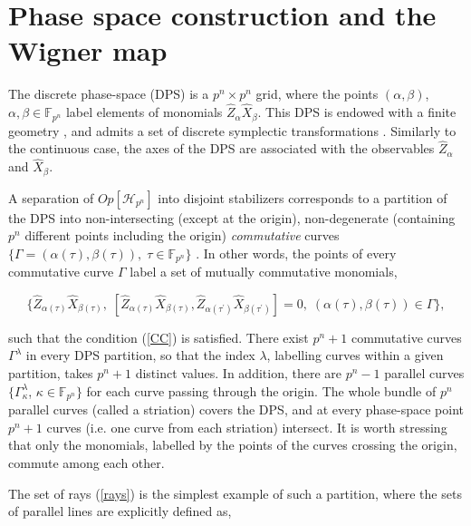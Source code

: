 \documentclass[quantumrep,article,submit,pdftex,moreauthors]{Definitions/mdpi}
\begin{document}

\section{Phase space construction and the Wigner map}

The discrete phase-space (DPS) \cite{gibbons,galvao,cormick,DFW11,DFW12} is a
$p^{n} \times p^{n}$ grid, where the points $(\alpha ,\beta )$, $\alpha,\beta
\in \mathbb{F}_{p^{n}}$ label elements of monomials
$\hat{Z}_{\alpha}\hat{X}_{\beta}$. This DPS is endowed with a finite geometry
\cite{gibbons,galvao,cormick,DFW11,DFW12,FF}, and admits a set of discrete
symplectic transformations \cite{DFW2-1,DFW2-2,DFW2-3,DFW2-4,klimov06}.
Similarly to the continuous case, the axes of the DPS are associated with the
observables $\hat{Z}_{\alpha}$ and $\hat{X}_{\beta}$.

A separation of $Op[\mathcal{H}_{p^{n}}]$ into disjoint stabilizers corresponds
to a partition of the DPS into non-intersecting (except at the origin),
non-degenerate (containing $p^{n}$ different points including the origin)
\textit{commutative} curves $\{\Gamma =\left( \alpha(\tau),\beta(\tau)\right),
\; \tau \in \mathbb{F}_{p^{n}}\}$ \cite{GS2,JPA09}. In other words, the points
of every commutative curve $\Gamma$ label a set of mutually commutative
monomials,

\begin{equation}
  \{\hat{Z}_{\alpha(\tau)}\hat{X}_{\beta(\tau)}, \;
  [\hat{Z}_{\alpha(\tau)} \hat{X}_{\beta(\tau)},
  \hat{Z}_{\alpha (\tau^{\prime})}\hat{X}_{\beta(\tau^{\prime})}]
  = 0, \; \left( \alpha(\tau),\beta(\tau)\right) \in \Gamma \},
\end{equation}

such that the condition (\ref{CC}) is satisfied. There exist $p^{n}+1$
commutative curves $\Gamma^{\lambda}$ in every DPS partition, so that the index
$\lambda$, labelling curves within a given partition, takes $p^{n}+1$ distinct
values. In addition, there are $p^{n}-1$ parallel curves
$\{\Gamma_{\kappa}^{\lambda}$, $\kappa \in \mathbb{F}_{p^{n}}\}$ for each curve
passing through the origin.  The whole bundle of $p^{n}$ parallel curves (called
a striation) covers the DPS, and at every phase-space point $p^{n}+1$ curves
(i.e.  one curve from each striation) intersect. It is worth stressing that only
the monomials, labelled by the points of the curves crossing the origin, commute
among each other.

The set of rays (\ref{rays}) is the simplest example of such a partition, where
the sets of parallel lines are explicitly defined as,
\end{document}
